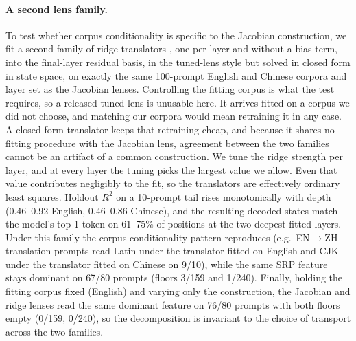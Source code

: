 \paragraph{A second lens family.}
To test whether corpus conditionality is specific to the Jacobian
construction, we fit a second family of ridge translators
\citep{hoerl1970ridge}, one per layer and without a bias term, into the final-layer
residual basis, in the tuned-lens style \citep{belrose2023tuned} but
solved in closed form in state space, on exactly the same 100-prompt
English and Chinese corpora and layer set as the Jacobian lenses.
Controlling the fitting corpus is what the test requires, so a released
tuned lens is unusable here. It arrives fitted on a corpus we did not
choose, and matching our corpora would mean retraining it in any case. A
closed-form translator keeps that retraining cheap, and because it shares
no fitting procedure with the Jacobian lens, agreement between the two
families cannot be an artifact of a common construction.
We tune the ridge strength per layer, and at every layer the tuning
picks the largest value we allow. Even that value contributes
negligibly to the fit, so the translators are effectively ordinary
least squares.
Holdout \(R^2\) on a 10-prompt tail rises monotonically with depth
(0.46--0.92 English, 0.46--0.86 Chinese), and the resulting decoded
states match the model's top-1
token on 61--75\% of positions at the two deepest fitted layers. Under
this family the corpus conditionality pattern reproduces (e.g.\
EN\(\to\)ZH translation prompts read Latin under the translator fitted on
English and CJK under the translator fitted on Chinese on 9/10), while the same SRP
feature stays dominant on 67/80 prompts (floors 3/159 and 1/240).
Finally, holding the fitting corpus fixed (English) and varying only
the construction, the Jacobian and ridge lenses read the same dominant
feature on 76/80 prompts with both floors empty (0/159, 0/240), so the
decomposition is invariant to the choice of transport across the two families.

